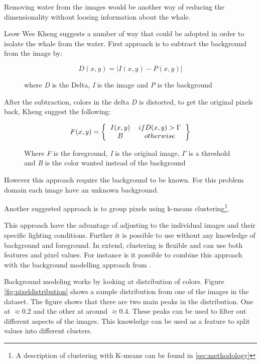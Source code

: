 Removing water from the images would be another way of reducing the dimensionality without loosing information about the whale.

Leow Wee Kheng suggests a number of way that could be adopted in order to isolate the whale from the water\cite{backgroundRemoval}.
First approach is to subtract the background from the image by:
\begin{figure}[H]
\begin{equation}
D(x,y) = |I(x,y) - P(x,y)|
\end{equation}
\caption{where \emph{D} is the Delta, \emph{I} is the image and \emph{P} is the background}
\end{figure}

After the subtraction, colors in the delta \emph{D} is distorted, to get the original pixels back, Kheng suggest the following:

\begin{figure}[H]
\begin{equation}
F(x,y) = \left \{
\begin{tabular}{cc}
$I(x,y)$ & $if D(x,y) > \Gamma$ \\
$B$      & $otherwise$
\end{tabular}  
\right \}
\end{equation}
\caption{Where \emph{F} is the foreground, \emph{I} is the original image, $\Gamma$ is a threshold and \emph{B} is the color wanted instead of the background}
\end{figure}

However this approach require the background to be known. For this problem domain each image have an unknown background.

Another suggested approach is to group pixels using k-means clustering\footnote{A description of clustering with K-means can be found in \ref{sec:methodology}}.

This approach have the advantage of adjusting to the individual images and their specific lighting conditions. Further it is possible to use without any knowledge of background and foreground. 
In extend, clustering is flexible and can use both features and pixel values.
For instance is it possible to combine this approach with the background modelling approach from \cite{backgroundRemoval}.
  
Background modeling works by looking at distribution of colors. Figure \ref{fig:pixeldistribution} shows a sample distribution from one of the images in the dataset. The figure shows that there are two main peaks in the distribution. One at \(\approx0.2\) and the other at around \(\approx0.4\). 
These peaks can be used to filter out different aspects of the images. This knowledge can be used as a feature to split values into different clusters.
 
